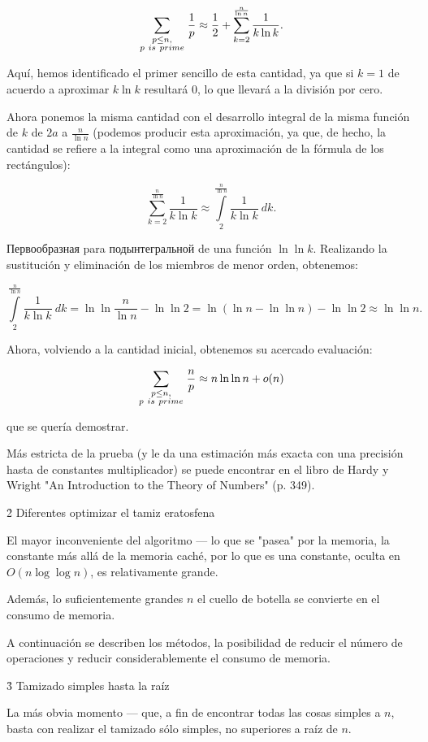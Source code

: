 $$ \sum_{ \scriptstyle p \le n, \atop\scriptstyle p~is~prime } \frac{1}{p} \approx \frac{1}{2} + \sum_{k=2}^{\frac{n}{\ln n}} \frac{1}{k \ln k}. $$

Aquí, hemos identificado el primer sencillo de esta cantidad, ya que si $k = 1$ de acuerdo a aproximar $k \ln k$ resultará $0$, lo que llevará a la división por cero.

Ahora ponemos la misma cantidad con el desarrollo integral de la misma función de $k$ de $2 a$ a $\frac{n}{\ln n}$ (podemos producir esta aproximación, ya que, de hecho, la cantidad se refiere a la integral como una aproximación de la fórmula de los rectángulos):

$$ \sum_{k=2}^{\frac{n}{\ln n}} \frac{1}{k \ln k} \approx \int\limits_2^{\frac{n}{\ln n}} \frac{1}{k \ln k}\ dk. $$

Первообразная para подынтегральной de una función $\ln \ln k$. Realizando la sustitución y eliminación de los miembros de menor orden, obtenemos:

$$ \int\limits_2^{\frac{n}{\ln n}} \frac{1}{k \ln k}\ dk = \ln \ln \frac{n}{\ln n} - \ln \ln 2 = \ln (\ln n - \ln \ln n) - \ln \ln 2 \approx \ln \ln n. $$

Ahora, volviendo a la cantidad inicial, obtenemos su acercado evaluación:

$$ \sum_{ \scriptstyle p \le n, \atop\scriptstyle p~is~prime } \frac{n}{p} \approx n \ln \ln n + o(n) $$

que se quería demostrar.

Más estricta de la prueba (y le da una estimación más exacta con una precisión hasta de constantes multiplicador) se puede encontrar en el libro de Hardy y Wright "An Introduction to the Theory of Numbers" (p. 349).


\h2{ Diferentes optimizar el tamiz eratosfena }

El mayor inconveniente del algoritmo --- lo que se "pasea" por la memoria, la constante más allá de la memoria caché, por lo que es una constante, oculta en $O (n \log \log n)$, es relativamente grande.

Además, lo suficientemente grandes $n$ el cuello de botella se convierte en el consumo de memoria.

A continuación se describen los métodos, la posibilidad de reducir el número de operaciones y reducir considerablemente el consumo de memoria.


\h3{ Tamizado simples hasta la raíz }

La más obvia momento --- que, a fin de encontrar todas las cosas simples a $n$, basta con realizar el tamizado sólo simples, no superiores a raíz de $n$.


